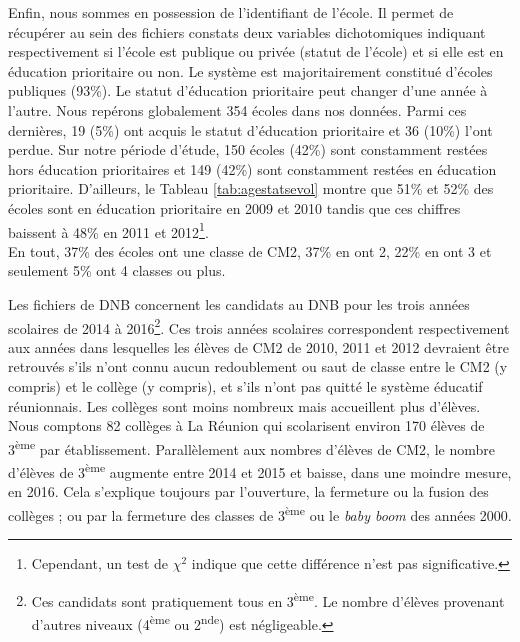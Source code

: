 \documentclass[
]{book}
\begin{document}
\quad Enfin, nous sommes en possession de l'identifiant de l'école. Il permet de récupérer au sein des fichiers constats deux variables dichotomiques indiquant respectivement si l'école est publique ou privée (statut de l'école) et si elle est en éducation prioritaire ou non. Le système est majoritairement constitué d'écoles publiques (93\%). Le statut d'éducation prioritaire peut changer d'une année à l'autre. Nous repérons globalement 354 écoles dans nos données. Parmi ces dernières, 19 (5\%) ont acquis le statut d'éducation prioritaire et 36 (10\%) l'ont perdue. Sur notre période d'étude, 150 écoles (42\%) sont constamment restées hors éducation prioritaires et 149 (42\%) sont constamment restées en éducation prioritaire. D'ailleurs, le Tableau \ref{tab:agestatsevol} montre que 51\% et 52\% des écoles sont en éducation prioritaire en 2009 et 2010 tandis que ces chiffres baissent à 48\% en 2011 et 2012\footnote{Cependant, un test de \(\chi^2\) indique que cette différence n'est pas significative.}.\\
En tout, 37\% des écoles ont une classe de CM2, 37\% en ont 2, 22\% en ont 3 et seulement 5\% ont 4 classes ou plus.

\quad Les fichiers de DNB concernent les candidats au DNB pour les trois années scolaires de 2014 à 2016\footnote{Ces candidats sont pratiquement tous en 3\textsuperscript{ème}. Le nombre d'élèves provenant d'autres niveaux (4\textsuperscript{ème} ou 2\textsuperscript{nde}) est négligeable.}. Ces trois années scolaires correspondent respectivement aux années dans lesquelles les élèves de CM2 de 2010, 2011 et 2012 devraient être retrouvés s'ils n'ont connu aucun redoublement ou saut de classe entre le CM2 (y compris) et le collège (y compris), et s'ils n'ont pas quitté le système éducatif réunionnais. Les collèges sont moins nombreux mais accueillent plus d'élèves. Nous comptons 82 collèges à La Réunion qui scolarisent environ 170 élèves de 3\textsuperscript{ème} par établissement. Parallèlement aux nombres d'élèves de CM2, le nombre d'élèves de 3\textsuperscript{ème} augmente entre 2014 et 2015 et baisse, dans une moindre mesure, en 2016. Cela s'explique toujours par l'ouverture, la fermeture ou la fusion des collèges ; ou par la fermeture des classes de 3\textsuperscript{ème} ou le \emph{baby boom} des années 2000.
\end{document}
